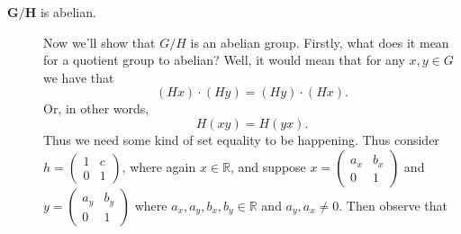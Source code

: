 \begin{description}
    \item[$\bm{G/H}$ is abelian.] Now we'll show that $G/H$ is an
    abelian group. Firstly, what does it mean for a quotient group to
    abelian? Well, it would mean that for any $x, y \in G$ we have
    that 
    \[
        (Hx)\cdot(Hy) = (Hy)\cdot(Hx).
    \]
    Or, in other words, 
    \[
        H(xy) = H(yx).   
    \]
    Thus we need some kind of set equality to be happening. Thus
    consider $h =             \begin{pmatrix}
        1 & c \\
        0 & 1    
    \end{pmatrix}$, where again $x \in \mathbb{R}$, and suppose $x =             \begin{pmatrix}
        a_x & b_x \\
        0 & 1    
    \end{pmatrix}$ and $y =             \begin{pmatrix}
        a_y & b_y \\
        0 & 1    
    \end{pmatrix}$ where $a_x,a_y,b_x,b_y \in \mathbb{R}$ and $a_y,
    a_x \ne 0$. Then observe that 


\end{description}
